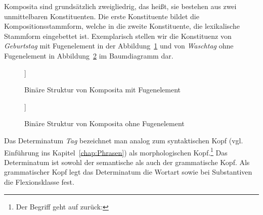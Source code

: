  Komposita sind grundsätzlich zweigliedrig, das heißt, sie bestehen aus zwei unmittelbaren Konstituenten. Die erste Konstituente bildet die Kompositionsstammform, welche in die zweite Konstituente, die lexikalische Stammform eingebettet ist. Exemplarisch stellen wir die Konstituenz von \textit{Geburtstag} mit Fugenelement in der Abbildung~\ref{Abb:Geburtstag} und von \textit{Waschtag} ohne Fugenelement in Abbildung~\ref{Abb:Waschtag} im Baumdiagramm dar. 
 
 \begin{figure}
	\centering
	\begin{forest}
		[Stammform \\Substantiv Mask\\\textit{Geburtstag} [Kompositionsstammform\\ Substantiv Fem\\\textit{geburts}][Stammform \\ Substantiv Mask\\\textit{Tag}]]	
	\end{forest}
\caption{Binäre Struktur von Komposita mit Fugenelement}\label{Abb:Geburtstag}
\end{figure}

	
	\begin{figure}
		\centering
	\begin{forest}
		[Stammform\\Substantiv Mask\\ \textit{Waschtag}[Kompositionsstammform \\ Verb\\\textit{wasch}][Stammform\\ Substantiv Mask\\\textit{Tag}]]
	\end{forest}
	\caption{Binäre Struktur von Komposita ohne Fugenelement}\label{Abb:Waschtag}
\end{figure}


Das Determinatum \textit{Tag} bezeichnet man analog zum syntaktischen Kopf (vgl. Einführung ins Kapitel~\ref{chap:Phrasen}) als morphologischen Kopf.\footnote{Der Begriff geht auf \citet[235]{Bloomfield1935} zurück: } Das Determinatum ist sowohl der semantische als auch der grammatische Kopf. Als grammatischer Kopf legt das Determinatum die Wortart sowie bei Substantiven die Flexionsklasse fest.

